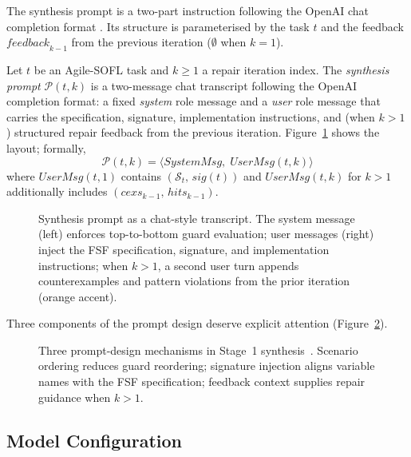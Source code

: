 The synthesis prompt is a two-part instruction following the OpenAI chat
completion format \citep{openai2023gpt4, chen2021codex}.
Its structure is parameterised by the task $t$ and the
feedback $\mathit{feedback}_{k-1}$ from the previous iteration
($\emptyset$ when $k = 1$).

\begin{definition}
\label{def:prompt}
Let $t$ be an Agile-SOFL task and $k \ge 1$ a repair iteration index.
The \emph{synthesis prompt} $\mathcal{P}(t, k)$ is a two-message chat
transcript following the OpenAI completion format: a fixed \emph{system}
role message and a \emph{user} role message that carries the specification,
signature, implementation instructions, and (when $k > 1$) structured repair
feedback from the previous iteration.
Figure~\ref{fig:synthesis-prompt-chat} shows the layout; formally,
\[
  \mathcal{P}(t,k) = \langle \mathit{SystemMsg},\; \mathit{UserMsg}(t,k) \rangle
\]
where $\mathit{UserMsg}(t,1)$ contains $(\mathcal{S}_t,\, \mathit{sig}(t))$ and
$\mathit{UserMsg}(t,k)$ for $k > 1$ additionally includes
$(\mathit{cexs}_{k-1},\, \mathit{hits}_{k-1})$.
\end{definition}

\begin{figure}[t]
  \centering
  \caption{Synthesis prompt as a chat-style transcript.
           The system message (left) enforces top-to-bottom guard evaluation;
           user messages (right) inject the FSF specification, signature, and
           implementation instructions; when $k > 1$, a second user turn appends
           counterexamples and pattern violations from the prior iteration
           (orange accent).}
  \label{fig:synthesis-prompt-chat}
\end{figure}

Three components of the prompt design deserve explicit attention
(Figure~\ref{fig:prompt-design-cards}).

\begin{figure}[t]
  \centering
  \caption{Three prompt-design mechanisms in Stage~1 synthesis~\citep{li2022agilesofl}.
           Scenario ordering reduces guard reordering; signature
           injection aligns variable names with the FSF specification;
           feedback context supplies repair guidance when $k > 1$.}
  \label{fig:prompt-design-cards}
\end{figure}

\subsection{Model Configuration}
\label{subsec:method:model}

